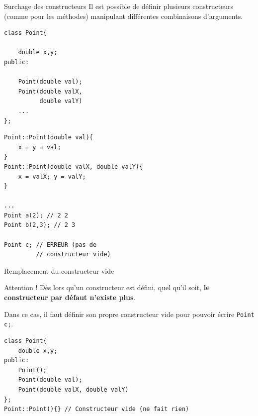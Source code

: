 \begin{frame}[fragile=singleslide]{Surchage des constructeurs}
    Il est possible de définir plusieurs constructeurs (comme pour les méthodes) manipulant différentes combinaisons d'arguments.

    \begin{minipage}{0.42\linewidth}
            \begin{verbatim}
class Point{

    double x,y;
public:

    Point(double val);
    Point(double valX,
          double valY)
    ...
};
            \end{verbatim}
    \end{minipage}
    \hfill
    \begin{minipage}{0.56\linewidth}
            \begin{verbatim}
Point::Point(double val){
    x = y = val;
}
Point::Point(double valX, double valY){
    x = valX; y = valY;
}

...
Point a(2); // 2 2
Point b(2,3); // 2 3

Point c; // ERREUR (pas de
         // constructeur vide)
            \end{verbatim}
    \end{minipage}
\end{frame}

\begin{frame}[fragile=singleslide]{Remplacement du constructeur vide}
    \begin{alertblock}{Attention !}
    Dès lors qu'un constructeur est défini, quel qu'il soit, \textbf{le constructeur par défaut n'existe plus}.
    \end{alertblock}

    Dans ce cas, il faut définir son propre constructeur vide pour pouvoir écrire \texttt{Point c;}.
    
        \begin{verbatim}
class Point{
    double x,y;
public:
    Point();
    Point(double val);
    Point(double valX, double valY)
};
Point::Point(){} // Constructeur vide (ne fait rien)
        \end{verbatim}
    
\end{frame}

